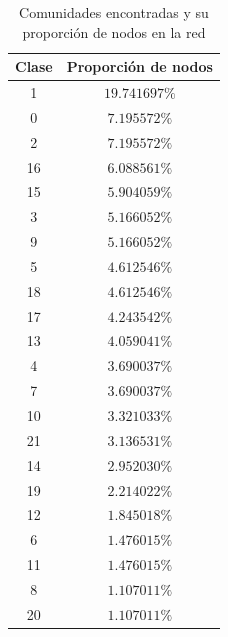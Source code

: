 \documentclass[10pt,a4paper,spanish]{article}
\numberwithin{equation}{section} %
\numberwithin{figure}{section} %
\numberwithin{table}{section} %
\begin{document}
\begin{table}[!h]
    \centering
    \begin{tabular}{c | c}
    Clase & Proporción de nodos \\
    \hline
    1   &  $19.741697\%$ \\
    0   &   $7.195572\%$ \\
    2   &   $7.195572\%$ \\
    16   &  $6.088561\%$ \\
    15   &  $5.904059\%$ \\
    3   &   $5.166052\%$ \\
    9   &   $5.166052\%$ \\
    5   &   $4.612546\%$ \\
    18   &  $4.612546\%$ \\
    17   &  $4.243542\%$ \\
    13   &  $4.059041\%$ \\
    4   &   $3.690037\%$ \\
    7   &   $3.690037\%$ \\
    10   &  $3.321033\%$ \\
    21   &  $3.136531\%$ \\
    14   &  $2.952030\%$ \\
    19   &  $2.214022\%$ \\
    12   &  $1.845018\%$ \\
    6   &   $1.476015\%$ \\
    11   &  $1.476015\%$ \\
    8   &   $1.107011\%$ \\
    20   &  $1.107011\%$ 
    \end{tabular}
    \caption{Comunidades encontradas y su proporción de nodos en la red}
    \label{comsn}
\end{table}

\newpage
\end{document}
